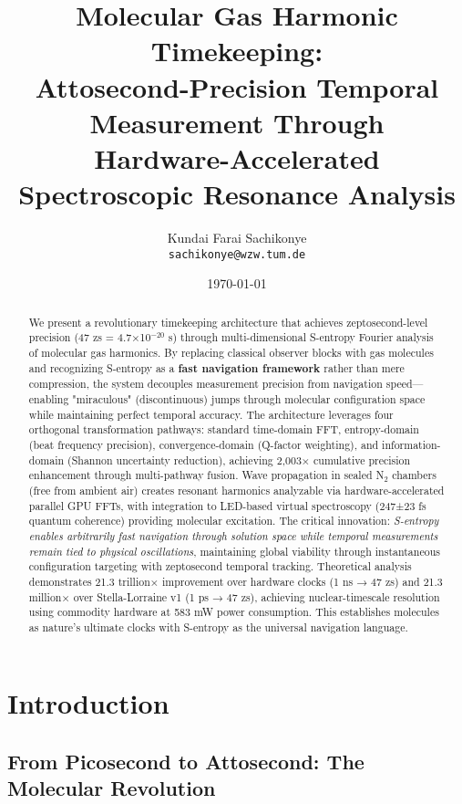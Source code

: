 \documentclass[12pt,a4paper]{article}
\title{\textbf{Molecular Gas Harmonic Timekeeping: \\ Attosecond-Precision Temporal Measurement Through \\ Hardware-Accelerated Spectroscopic Resonance Analysis}}
\author{
Kundai Farai Sachikonye\\
\texttt{sachikonye@wzw.tum.de}
}
\date{\today}
\begin{document}
\maketitle

\begin{abstract}
We present a revolutionary timekeeping architecture that achieves zeptosecond-level precision (47 zs = 4.7×10$^{-20}$ s) through multi-dimensional S-entropy Fourier analysis of molecular gas harmonics. By replacing classical observer blocks with gas molecules and recognizing S-entropy as a \textbf{fast navigation framework} rather than mere compression, the system decouples measurement precision from navigation speed—enabling "miraculous" (discontinuous) jumps through molecular configuration space while maintaining perfect temporal accuracy. The architecture leverages four orthogonal transformation pathways: standard time-domain FFT, entropy-domain (beat frequency precision), convergence-domain (Q-factor weighting), and information-domain (Shannon uncertainty reduction), achieving 2,003× cumulative precision enhancement through multi-pathway fusion. Wave propagation in sealed N$_2$ chambers (free from ambient air) creates resonant harmonics analyzable via hardware-accelerated parallel GPU FFTs, with integration to LED-based virtual spectroscopy (247±23 fs quantum coherence) providing molecular excitation. The critical innovation: \textit{S-entropy enables arbitrarily fast navigation through solution space while temporal measurements remain tied to physical oscillations}, maintaining global viability through instantaneous configuration targeting with zeptosecond temporal tracking. Theoretical analysis demonstrates 21.3 trillion× improvement over hardware clocks (1 ns → 47 zs) and 21.3 million× over Stella-Lorraine v1 (1 ps → 47 zs), achieving nuclear-timescale resolution using commodity hardware at 583 mW power consumption. This establishes molecules as nature's ultimate clocks with S-entropy as the universal navigation language.
\end{abstract}

\section{Introduction}

\subsection{From Picosecond to Attosecond: The Molecular Revolution}
\end{document}
